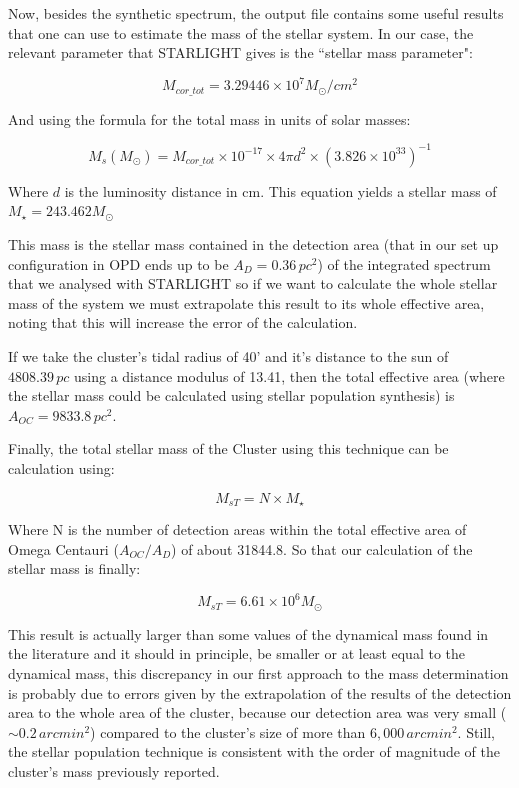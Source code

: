 Now, besides the synthetic spectrum, the output file contains some useful results that one can use to estimate the mass of the stellar system. In our case, the relevant parameter that STARLIGHT gives is the ``stellar mass parameter":

\begin{equation}
M_{cor\_tot} = 3.29446 \times 10^{7} M_{\odot}/cm^{2}
\end{equation}

And using the formula for the total mass in units of solar masses:

\begin{equation}
M_{s}(M_{\odot})=M_{cor\_tot}\times10^{-17}\times4\pi d^{2}\times\left(3.826\times10^{33}\right)^{-1}
\end{equation}

Where $d$ is the luminosity distance in cm. This equation yields a stellar mass of $M_{\star}=243.462M_{\odot}$

This mass is the stellar mass contained in the detection area (that in our set up configuration in OPD ends up to be $A_{D}=0.36\,pc^{2}$) of the integrated spectrum that we analysed with STARLIGHT so if we want to calculate the whole stellar mass of the system we must extrapolate this result to its whole effective area, noting that this will increase the error of the calculation.

If we take the cluster's tidal radius of 40' and it's distance to the sun of $4808.39\,pc$ using a distance modulus of 13.41, then the total effective area (where the stellar mass could be calculated using stellar population synthesis) is $A_{OC}=9833.8\,pc^{2}$. 

Finally, the total stellar mass of the Cluster using this technique can be calculation using:

\begin{equation}
M_{s T} = N \times M_{\star}
\end{equation}

Where N is the number of detection areas within the total effective area of Omega Centauri ($A_{OC}/A_{D}$) of about 31844.8. So that our calculation of the stellar mass is finally:

\begin{equation}
M_{s T} = 6.61 \times 10^{6}M_{\odot}
\end{equation}
 
This result is actually larger than some values  of the dynamical mass found in the literature and it should in principle, be smaller or at least equal to the dynamical mass, this discrepancy in our first approach to the mass determination is probably due to errors given by the extrapolation of the results of the detection area to the whole area of the cluster, because our detection area was very small ($\sim 0.2 \, arcmin^{2}$) compared to the cluster's size of more than $6,000 \, arcmin^{2}$. Still, the stellar population technique is consistent with the order of magnitude of the cluster's mass previously reported. 


